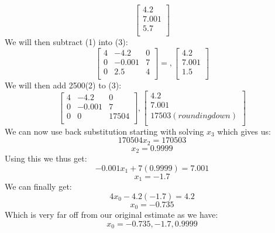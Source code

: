 \documentclass[12pt]{article}
\begin{document}
\begin{adjustwidth}{0em}{0pt}
\[\begin{bmatrix}
4.2 \\
7.001 \\
5.7 \\
\end{bmatrix}\]
We will then subtract (1) into (3):
\[ 
\begin{bmatrix}
4 & -4.2 & 0\\
0 & -0.001 & 7 \\
0 & 2.5 & 4 \\
\end{bmatrix} =,
\begin{bmatrix}
4.2 \\
7.001 \\
1.5 \\
\end{bmatrix}\]
We will then add 2500(2) to (3):
\[ 
\begin{bmatrix}
4 & -4.2 & 0\\
0 & -0.001 & 7 \\
0 & 0 & 17504 \\
\end{bmatrix}, \begin{bmatrix}
4.2 \\
7.001 \\
17503 (rounding down) \\
\end{bmatrix}\]
We can now use back substitution starting with solving $x_3$ which gives us:
\[ 170504x_2 = 170503 \]
\[ x_2 = 0.9999 \]
Using this we thus get:
\[ -0.001x_1 + 7(0.9999) = 7.001 \]
\[ x_1 = -1.7\]
We can finally get:
\[ 4x_0 - 4.2(-1.7) = 4.2 \]
\[ x_0 = -0.735\]
Which is very far off from our original estimate as we have:
\[ x_0 = -0.735, -1.7, 0.9999 \]


\end{adjustwidth}
\end{document}
